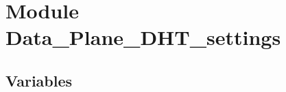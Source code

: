%
%
%


\section{Module Data\_Plane\_DHT\_settings}

    \label{Data_Plane_DHT_settings}


  \subsection{Variables}

